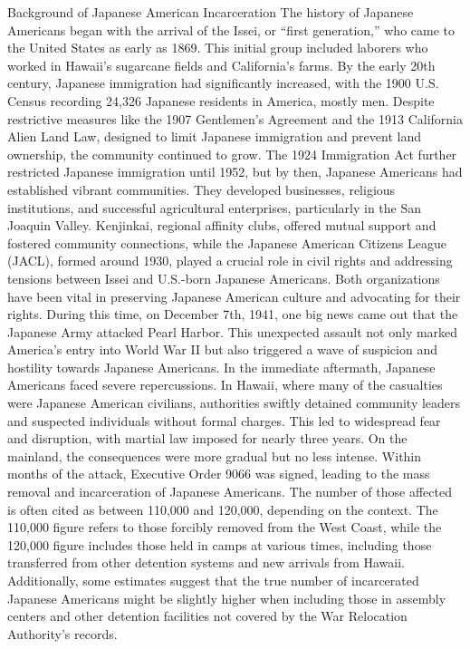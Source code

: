 Background of Japanese American Incarceration
The history of Japanese Americans began with the arrival of the Issei, or “first generation,” who came to the United States as early as 1869. This initial group included laborers who worked in Hawaii’s sugarcane fields and California’s farms. By the early 20th century, Japanese immigration had significantly increased, with the 1900 U.S. Census recording 24,326 Japanese residents in America, mostly men. Despite restrictive measures like the 1907 Gentlemen’s Agreement and the 1913 California Alien Land Law, designed to limit Japanese immigration and prevent land ownership, the community continued to grow. The 1924 Immigration Act further restricted Japanese immigration until 1952, but by then, Japanese Americans had established vibrant communities. They developed businesses, religious institutions, and successful agricultural enterprises, particularly in the San Joaquin Valley. Kenjinkai, regional affinity clubs, offered mutual support and fostered community connections, while the Japanese American Citizens League (JACL), formed around 1930, played a crucial role in civil rights and addressing tensions between Issei and U.S.-born Japanese Americans. Both organizations have been vital in preserving Japanese American culture and advocating for their rights. During this time, on December 7th, 1941, one big news came out that the Japanese Army attacked Pearl Harbor. This unexpected assault not only marked America's entry into World War II but also triggered a wave of suspicion and hostility towards Japanese Americans. In the immediate aftermath, Japanese Americans faced severe repercussions. In Hawaii, where many of the casualties were Japanese American civilians, authorities swiftly detained community leaders and suspected individuals without formal charges. This led to widespread fear and disruption, with martial law imposed for nearly three years. On the mainland, the consequences were more gradual but no less intense. Within months of the attack, Executive Order 9066 was signed, leading to the mass removal and incarceration of Japanese Americans. The number of those affected is often cited as between 110,000 and 120,000, depending on the context. The 110,000 figure refers to those forcibly removed from the West Coast, while the 120,000 figure includes those held in camps at various times, including those transferred from other detention systems and new arrivals from Hawaii. Additionally, some estimates suggest that the true number of incarcerated Japanese Americans might be slightly higher when including those in assembly centers and other detention facilities not covered by the War Relocation Authority’s records.

